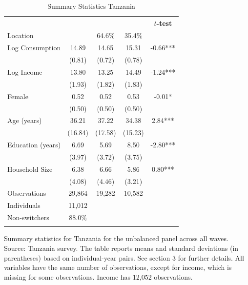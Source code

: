\begin{table}[htbp] \centering \caption{Summary Statistics Tanzania}\label{tab:summary_stats_TZA_unb_2waves} \begin{threeparttable} \begin{tabular}{l cccc} \toprule
 &  &  &  & $t$-test \\
\midrule
Location &  &   64.6\% &   35.4\% &  \\  \addlinespace \addlinespace
Log Consumption & 14.89 & 14.65 & 15.31 & -0.66*** \\
 & (0.81) & (0.72) & (0.78) &  \\  \addlinespace
Log Income & 13.80 & 13.25 & 14.49 & -1.24*** \\
 & (1.93) & (1.82) & (1.83) &  \\  \addlinespace
Female & 0.52 & 0.52 & 0.53 & -0.01* \\
 & (0.50) & (0.50) & (0.50) &  \\  \addlinespace
Age (years) & 36.21 & 37.22 & 34.38 & 2.84*** \\
 & (16.84) & (17.58) & (15.23) &  \\  \addlinespace
Education (years) & 6.69 & 5.69 & 8.50 & -2.80*** \\
 & (3.97) & (3.72) & (3.75) &  \\  \addlinespace
Household Size & 6.38 & 6.66 & 5.86 & 0.80*** \\
 & (4.08) & (4.46) & (3.21) &  \\  \addlinespace


\cmidrule{2-5}
Observations & 29,864 & 19,282 & 10,582 &  \\  \addlinespace
Individuals & 11,012 &  &  &  \\
Non-switchers &   88.0\% &  &  &  \\  \addlinespace
\bottomrule \end{tabular} \begin{tablenotes}[flushleft] \footnotesize \item{Summary statistics for Tanzania for the unbalanced panel across all waves. Source: Tanzania survey. The table reports means and standard deviations (in parentheses) based on individual-year pairs. See section 3 for further details. All variables have the same number of observations, except for income, which is missing for some observations. Income has 12,052 observations.} \end{tablenotes} \end{threeparttable} \end{table}